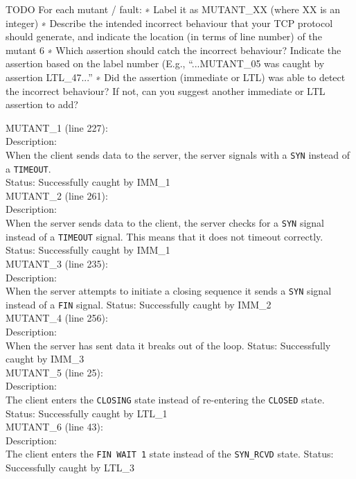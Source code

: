 \documentclass{WigReport}
\begin{document}
TODO
For each mutant / fault:
∗ Label it as MUTANT\_XX (where XX is an integer)
∗ Describe the intended incorrect behaviour that your TCP protocol should generate, and indicate the location (in terms of line number) of the mutant 6
∗ Which assertion should catch the incorrect behaviour? Indicate the assertion based on the label number (E.g., “...MUTANT\_05 was caught by assertion LTL\_47...”
∗ Did the assertion (immediate or LTL) was able to detect the incorrect behaviour? If not, can you suggest another immediate or LTL assertion to add?

MUTANT\_1 (line 227):\\
Description:\\
When the client sends data to the server, the server signals with a \verb|SYN| instead of a \verb|TIMEOUT|.\\
Status: Successfully caught by IMM\_1
\\

MUTANT\_2 (line 261):\\
Description:\\
When the server sends data to the client, the server checks for a \verb|SYN| signal instead of a \verb|TIMEOUT| signal. This means that it does not timeout correctly.
Status: Successfully caught by IMM\_1
\\

MUTANT\_3 (line 235):\\
Description:\\
When the server attempts to initiate a closing sequence it sends a \verb|SYN| signal instead of a \verb|FIN| signal.
Status: Successfully caught by IMM\_2
\\

MUTANT\_4 (line 256):\\
Description:\\
When the server has sent data it breaks out of the loop.
Status: Successfully caught by IMM\_3
\\

MUTANT\_5 (line 25):\\
Description:\\
The client enters the \verb|CLOSING| state instead of re-entering the \verb|CLOSED| state.
Status: Successfully caught by LTL\_1
\\

MUTANT\_6 (line 43):\\
Description:\\
The client enters the \verb|FIN WAIT 1| state instead of the \verb|SYN_RCVD| state.
Status: Successfully caught by LTL\_3
\\
\end{document}
